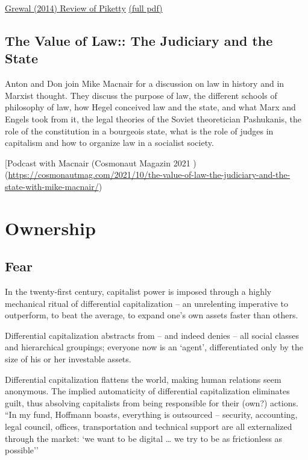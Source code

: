 \documentclass[
]{book}
\begin{document}
\href{https://harvardlawreview.org/2014/12/the-laws-of-capitalism/}{Grewal (2014) Review of Piketty}
\href{pdf/Grewal_2014_laws_of_Capitalism.pdf}{(full pdf)}

\hypertarget{the-value-of-law-the-judiciary-and-the-state}{%
\section{The Value of Law:: The Judiciary and the State}\label{the-value-of-law-the-judiciary-and-the-state}}

Anton and Don join Mike Macnair for a discussion on law in history and in Marxist thought. They discuss the purpose of law, the different schools of philosophy of law, how Hegel conceived law and the state, and what Marx and Engels took from it, the legal theories of the Soviet theoretician Pashukanis, the role of the constitution in a bourgeois state, what is the role of judges in capitalism and how to organize law in a socialist society.

{[}Podcast with Macnair (Cosmonaut Magazin 2021 )(\url{https://cosmonautmag.com/2021/10/the-value-of-law-the-judiciary-and-the-state-with-mike-macnair/})

\hypertarget{ownership}{%
\chapter{Ownership}\label{ownership}}

\hypertarget{fear}{%
\section{Fear}\label{fear}}

In the twenty-first century, capitalist power is imposed through a highly mechanical ritual of
differential capitalization -- an unrelenting imperative to outperform, to beat the average, to
expand one's own assets faster than others.

Differential capitalization
abstracts from -- and indeed denies -- all social classes and hierarchical groupings; everyone
now is an `agent', differentiated only by the size of his or her investable assets.

Differential capitalization flattens the world,
making human relations seem anonymous.
The implied
automaticity of differential capitalization eliminates guilt, thus absolving capitalists from being
responsible for their (own?) actions.
``In my fund, Hoffmann boasts, everything is outsourced -- security, accounting, legal
council, offices, transportation and technical support are all externalized through the market:
`we want to be digital \ldots{} we try to be as frictionless as possible''
\end{document}
